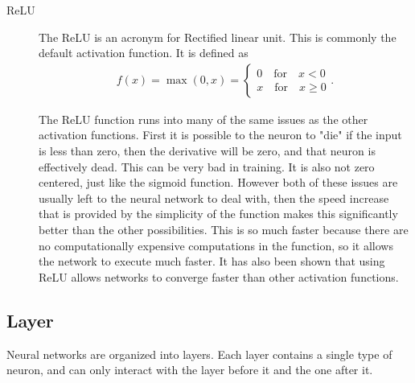 \documentclass[10pt]{amsart}
\newenvironment{Figure}
{\par\medskip\noindent\minipage{\linewidth}}
{\endminipage\par\medskip}
\begin{document}
\begin{multicols}{2}
\begin{description}
    \item[ReLU] The ReLU is an acronym for Rectified linear unit. This is
      commonly the default activation function. It is defined as
      \begin{align*}
        f(x)=\max(0,x)=\begin{cases}
          0\quad\text{for}\quad x<0  \\ x\quad\text{for}\quad x\geq 0
        \end{cases}.
      \end{align*}
      \begin{Figure}
      \begin{center}
      \end{center}
      \label{fig:tanh}
      \end{Figure}
      The ReLU function runs into many of the same issues as the other
      activation functions. First it is possible to the neuron to "die" if the
      input is less than zero, then the derivative will be zero, and that
      neuron is effectively dead. This can be very bad in training. It is also
      not zero centered, just like the sigmoid function. However both of these
      issues are usually left to the neural network to deal with, then the
      speed increase that is provided by the simplicity of the function makes
      this significantly better than the other possibilities. This is so much
      faster because there are no computationally expensive computations in the
      function, so it allows the network to execute much faster. It has also
      been shown that using ReLU allows networks to converge faster than other
      activation functions.
  \end{description}

  \subsection{Layer}%
  \label{sub:layer}

  Neural networks are organized into layers. Each layer contains a single type
  of neuron, and can only interact with the layer before it and the one after
  it.


\end{multicols}
\end{document}
